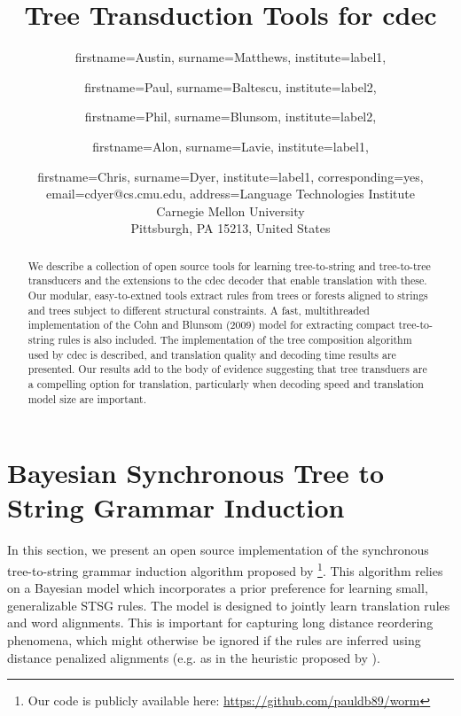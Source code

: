 \documentclass[nofonts]{pbml} %
\begin{document}
\title{Tree Transduction Tools for cdec}


\author{
  firstname=Austin,
  surname=Matthews,
  institute=label1,
}
\author{
  firstname=Paul,
  surname=Baltescu,
  institute=label2,
}
\author{
  firstname=Phil,
  surname=Blunsom,
  institute=label2,
}
\author{
  firstname=Alon,
  surname=Lavie,
  institute=label1,
}
\author{
  firstname=Chris,
  surname=Dyer,
  institute=label1,
  corresponding=yes,
  email={cdyer@cs.cmu.edu},
  address={Language Technologies Institute\\Carnegie Mellon University\\Pittsburgh, PA 15213, United States}
}

\PBMLmaketitle

\begin{abstract}
We describe a collection of open source tools for learning
tree-to-string and tree-to-tree transducers and the extensions to the
cdec decoder that enable translation with these. Our modular,
easy-to-extned tools extract rules from trees or forests aligned to
strings and trees subject to different structural constraints. A fast,
multithreaded implementation of the Cohn and Blunsom (2009) model for
extracting compact tree-to-string rules is also included. The
implementation of the tree composition algorithm used by cdec is
described, and translation quality and decoding time results are
presented. Our results add to the body of evidence suggesting that
tree transduers are a compelling option for translation, particularly
when decoding speed and translation model size are important.
\end{abstract}



\section{Bayesian Synchronous Tree to String Grammar Induction}

In this section, we present an open source implementation of the synchronous tree-to-string grammar induction algorithm proposed by \citet{Cohn2009} \footnote{Our code is publicly available here: \url{https://github.com/pauldb89/worm}}. This algorithm relies on a Bayesian model which incorporates a prior preference for learning small, generalizable STSG rules. The model is designed to jointly learn translation rules and word alignments. This is important for capturing long distance reordering phenomena, which might otherwise be ignored if the rules are inferred using distance penalized alignments (e.g. as in the heuristic proposed by \citet{Galley2004}).
\end{document}
